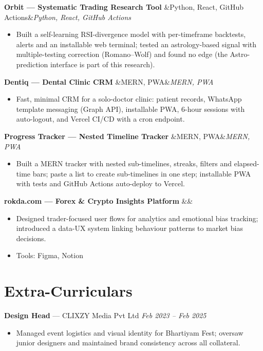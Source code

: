 \documentclass[10pt,a4paper]{article}
\newcommand{\role}[3]{%
  \vspace{5pt}%
  \textbf{#1} \textnormal{\textcolor{midgrey}{--- #2}}%
  \hfill\textcolor{midgrey}{\textit{#3}}%
  \vspace{1pt}%
}
\newcommand{\project}[2][]{%
  \vspace{5pt}%
  \textbf{#2}%
  \ifx&#1&\else\hfill\textcolor{midgrey}{\textit{#1}}\fi%
  \vspace{1pt}%
}
\begin{document}
\project[Python, React, GitHub Actions]{Orbit --- Systematic Trading Research Tool}
\begin{itemize}
  \item Built a self-learning RSI-divergence model with per-timeframe backtests, alerts and an installable web terminal; tested an astrology-based signal with multiple-testing correction (Romano--Wolf) and found no edge (the Astro-prediction interface is part of this research).
\end{itemize}

\project[MERN, PWA]{Dentiq --- Dental Clinic CRM}
\begin{itemize}
  \item Fast, minimal CRM for a solo-doctor clinic: patient records, WhatsApp template messaging (Graph API), installable PWA, 6-hour sessions with auto-logout, and Vercel CI/CD with a cron endpoint.
\end{itemize}

\project[MERN, PWA]{Progress Tracker --- Nested Timeline Tracker}
\begin{itemize}
  \item Built a MERN tracker with nested sub-timelines, streaks, filters and elapsed-time bars; paste a list to create sub-timelines in one step; installable PWA with tests and GitHub Actions auto-deploy to Vercel.
\end{itemize}

\project{rokda.com --- Forex \& Crypto Insights Platform}
\begin{itemize}
  \item Designed trader-focused user flows for analytics and emotional bias tracking;
        introduced a data-UX system linking behaviour patterns to market bias decisions.
  \item Tools: Figma, Notion
\end{itemize}

\section{Extra-Curriculars}

\role{Design Head}{CLIXZY Media Pvt Ltd}{Feb 2023 -- Feb 2025}
\begin{itemize}
  \item Managed event logistics and visual identity for Bhartiyam Fest; oversaw junior
        designers and maintained brand consistency across all collateral.
\end{itemize}
\end{document}

